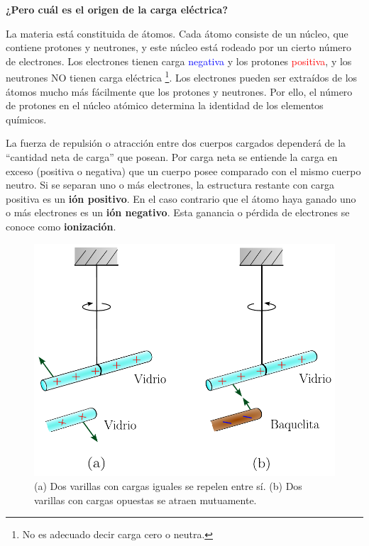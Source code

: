 \textbf{¿Pero cuál es el origen de la carga eléctrica?}

La materia está constituida de átomos. Cada átomo consiste de un núcleo, que contiene protones y neutrones, y este núcleo está rodeado por un cierto número de electrones. Los electrones tienen carga \textcolor{blue}{negativa} y los protones \textcolor{red}{positiva}, y los neutrones NO tienen carga eléctrica \footnote{No es adecuado decir carga cero o neutra.}. Los electrones pueden ser extraídos de los átomos mucho más fácilmente que los protones y neutrones. Por ello, el número de protones en el núcleo atómico determina la identidad de los elementos químicos.

La fuerza de repulsión o atracción entre dos cuerpos cargados dependerá de la  “cantidad neta de carga” que posean. Por carga neta se entiende la carga en exceso (positiva o negativa) que un cuerpo posee comparado con el mismo cuerpo neutro. Si se separan uno o más electrones, la estructura restante con carga positiva es un \textbf{ión positivo}. En el caso contrario que el átomo haya ganado uno o más electrones es un \textbf{ión negativo}. Esta ganancia o pérdida de electrones se conoce como \textbf{ionización}.

\begin{figure}[H]
    \centering
    \includegraphics[scale = 0.7]{Figuras/Cargas-Opuestas-Iguales.pdf}
    \caption{(a) Dos varillas con cargas iguales se repelen entre sí. (b) Dos varillas con cargas opuestas se atraen mutuamente.}
    \label{fig:Exp-Carga-Electrica2}
\end{figure}

